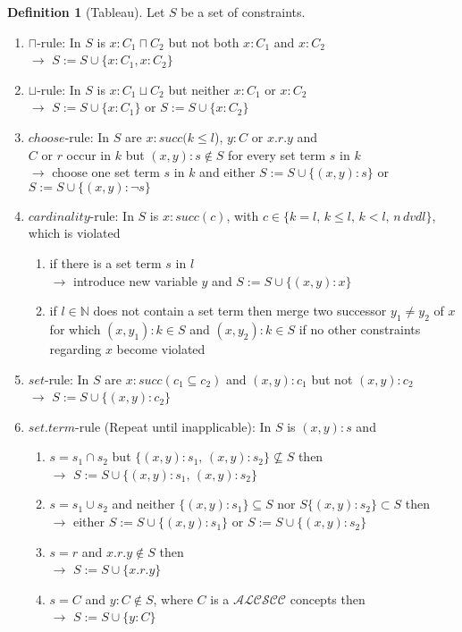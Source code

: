 \documentclass[a4paper,11pt]{scrartcl}
\theoremstyle{definition}
\newtheorem{mydef}{Definition}
\begin{document}
\begin{mydef}[Tableau]
Let $S$ be a set of constraints. 
\begin{enumerate}
\item\label{cap} $\sqcap$-rule: In $S$ is $x:C_1\sqcap C_2$ but not both $x:C_1$ and $x:C_2$\\
$\rightarrow$ $S:=S\cup\{x:C_1, x:C_2\}$
\item\label{cup} $\sqcup$-rule: In $S$ is $x:C_1\sqcup C_2$ but neither $x:C_1$ or $x:C_2$\\
$\rightarrow$ $S:=S\cup\{x:C_1\}$ or $S:=S\cup\{x:C_2\}$
\item\label{choose}$choose$-rule: In $S$ are
$x:succ(k\leq l$), $y:C$ or $x.r.y$ and\\ $C$ or $r$ occur in $k$ but $(x,y):s\not\in S$ for every set term $s$ in $k$\\
$\rightarrow$ choose one set term $s$ in $k$ and either $S:=S\cup\{(x,y):s\}$ or $S:=S\cup\{(x,y):\neg s\}$
\item\label{c}$cardinality$-rule: In $S$ is $x:succ(c)$, with $c\in\{k=l,\,k\leq l,\,k<l,\, n\, dvd l\}$, which is violated 
\begin{enumerate}
\item \label{setterm} if there is a set term $s$ in $l$\\
$\rightarrow$ introduce new variable $y$ and $S:=S\cup\{(x,y):x\}$
\item \label{exceeded} if $l\in \mathbb{N}$ does not contain a set term then merge two successor $y_1\neq y_2$ of $x$ for which $(x,y_1):k\in S$ and $(x,y_2):k\in S$ if no other constraints regarding $x$ become violated
\end{enumerate}
\item\label{s}$set$-rule: In $S$ are $x:succ(c_1\subseteq c_2)$ and $(x,y):c_1$ but not $(x,y):c_2$\\
$\rightarrow$ $S:=S\cup\{(x,y):c_2\}$
\item\label{repeat} $set.term$-rule (Repeat until inapplicable): In $S$ is $(x,y):s$ and
\begin{enumerate}
\item\label{setterm1} $s=s_1\cap s_2$ but $\{(x,y):s_1,\,(x,y):s_2\}\not\subseteq S$ then\\
$\rightarrow$ $S:=S\cup \{(x,y):s_1,\,(x,y):s_2\}$ 
\item\label{setterm2} $s=s_1\cup s_2$ and neither $\{(x,y):s_1\}\subseteq S$ nor $S\{(x,y):s_2\}\subset S$ then\\
$\rightarrow$ either $S:=S\cup \{(x,y):s_1\}$ or $S:=S\cup \{(x,y):s_2\}$ 
\item\label{setterm3} $s=r$ and $x.r.y\notin S$ then \\
$\rightarrow$ $S:=S\cup\{x.r.y\}$
\item\label{setterm4} $s=C$ and $y:C\notin S$, where $C$ is a $\mathcal{ALCSCC}$ concepts then \\
$\rightarrow$ $S:=S\cup\{y:C\}$
\end{enumerate}
\end{enumerate}
\end{mydef}
\end{document}

